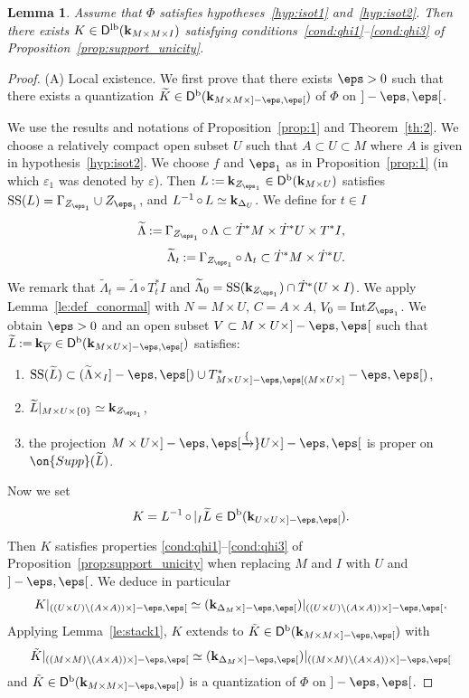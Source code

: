 \documentclass[12pt,leqno]{article}
\newtheorem{lemma}[theorem]{Lemma}
\theoremstyle{definition}
\def\epsilon{\varepsilon}
\newcommand{\cor}{{\bf k}}
\renewcommand{\to}[1][]{\xrightarrow[]{#1}}
\newcommand{\conv}[1][]{\mathop{\circ}\limits_{#1}}
\newcommand{\opb}[1]{#1^{-1}}
\newcommand{\eqdot}{\mathbin{:=}}
\newcommand{\seteq}{\mathbin{:=}}
\newcommand{\tw}[1]{\widetilde{#1}}
\newcommand{\ol}{\overline}
\newcommand{\banum}{\begin{enumerate}[{\rm(a)}]}
\newcommand{\eanum}{\end{enumerate}}
\newcommand{\eqn}{\begin{eqnarray*}}
\newcommand{\eneqn}{\end{eqnarray*}}
\newcommand{\Supp}{\on{Supp}}
\newcommand{\Der}[1][]{\mathsf{D}^{#1}}
\newcommand{\Derb}{\Der[\mathrm{b}]}
\newcommand{\Derlb}{\Der[\mathrm{lb}]}
\newcommand{\SSi}{\mathrm{SS}}
\newcommand{\Int}{{\rm Int}}
\newcommand{\dT}{{\dot{T}}}
\newcommand{\dTM}{{\dT}^*M}
\numberwithin{equation}{section}
\begin{document}
\begin{lemma}\label{lem:MainLemma}
Assume that $\Phi$ satisfies hypotheses~\eqref{hyp:isot1}
and~\eqref{hyp:isot2}.
Then there exists $K\in\Derlb(\cor_{M\times M\times I})$ satisfying
conditions~\eqref{cond:qhi1}--\eqref{cond:qhi3} of
Proposition~\ref{prop:support_unicity}.
\end{lemma}
\begin{proof}
(A) Local existence. 
We first prove that there exists $\eps>0$ such that 
there exists a quantization $\tw K\in\Derb(\cor_{M\times M\times]-\eps,\eps[}) $ 
of $\Phi$ on $]-\eps,\eps[$.

We use the results and notations of
Proposition~\ref{prop:1} and Theorem~\ref{th:2}. We choose a relatively
compact open subset $U$ such that $A\subset U\subset M$ where $A$ is given
in hypothesis~\eqref{hyp:isot2}. 
We choose $f$ and $\eps_1$ as in Proposition~\ref{prop:1}
(in which $\epsilon_1$ was denoted by $\epsilon$).  Then
$L\seteq\cor_{Z_{\eps_1}}\in\Derb(\cor_{M\times U})$ satisfies
$\SSi(L)=\Gamma_{Z_{\eps_1}}\cup Z_{\eps_1}$, and
$L^{-1}\conv L\simeq\cor_{\Delta_U}$.
We define for $t \in I$
\eqn
&&\tw\Lambda \eqdot \Gamma_{Z_{\eps_1}} \conv \Lambda
\subset \dTM\times\dT^*U\times  T^*I,\\
&&\tw\Lambda_t \eqdot \Gamma_{Z_{\eps_1}} \conv \Lambda_t
\subset \dT^*M \times \dT^*U.
\eneqn
We remark that $\tw\Lambda_t = \tw\Lambda \conv T^*_tI$ and
$\tw\Lambda_0 = \SSi(\cor_{Z_{\eps_1}})\cap\dT^*(U\times I)$.
We apply Lemma~\ref{le:def_conormal} with
$N= M\times U$, $C= A\times A$, $V_0 = \Int Z_{\eps_1}$.
We obtain $\eps>0$ and an open subset $V\subset M\times U\times ]-\eps,\eps[$
such that  $\tw L \eqdot \cor_{\ol V}
\in\Derb(\cor_{M\times U\times ]-\eps,\eps[})$ satisfies:
\banum
\item
$\SSi(\tw L)\subset (\tw\Lambda \times_I ]-\eps,\eps[) \cup 
T^*_{M\times U\times ]-\eps,\eps[}(M\times U\times ]-\eps,\eps[)$,
\item
$\tw L|_{M\times U\times \{0\}} \simeq \cor_{Z_{\eps_1}}$,
\item
the projection $M\times U\times ]-\eps,\eps[ \to U\times ]-\eps,\eps[$
is proper on $\Supp(\tw L)$.
\eanum
Now we set
\eqn
&&K=\opb{L}\conv|_I\tw L\in\Derb(\cor_{U\times U\times ]-\eps,\eps[}).
\eneqn
Then $K$ satisfies properties \eqref{cond:qhi1}--\eqref{cond:qhi3}
of Proposition~\ref{prop:support_unicity} when replacing $M$ and
 $I$ with $U$ and $]-\eps,\eps[$. 
We deduce in particular
\eqn
&&K\vert_{((U\times U)\setminus (A\times A))\times ]-\eps,\eps[}
\simeq (\cor_{\Delta_M\times ]-\eps,\eps[})
\vert_{((U\times U)\setminus (A\times A))\times ]-\eps,\eps[}.
\eneqn
Applying Lemma~\ref{le:stack1},
 $K$ extends to
$\tilde K\in \Derb(\cor_{M\times M\times ]-\eps,\eps[})$ with 
\eqn
&&\tilde K\vert_{((M\times M)\setminus (A\times A))\times ]-\eps,\eps[}
\simeq (\cor_{\Delta_M\times ]-\eps,\eps[})
\vert_{((M\times M)\setminus(A\times A))\times ]-\eps,\eps[}
\eneqn
and $\tilde K\in\Derb(\cor_{M\times M\times ]-\eps,\eps[})$ 
is a quantization of $\Phi$ on $]-\eps,\eps[$.


\end{proof}
\end{document}
